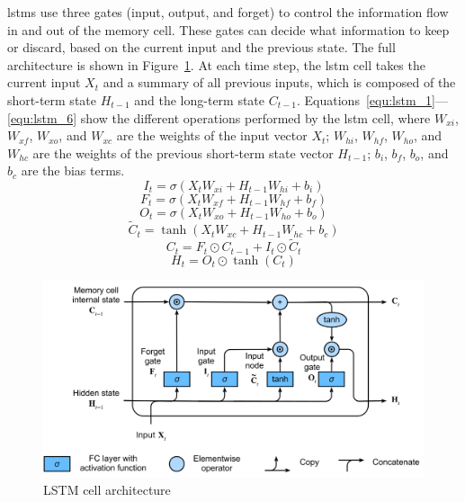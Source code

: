 \acrshort{lstm}s use three gates (input, output, and forget) to control the information flow in and out of the memory cell. These gates can decide what information to keep or discard, based on the current input and the previous state. The full architecture is shown in Figure~\ref{fig:lstm_architecture}. At each time step, the \acrshort{lstm} cell takes the current input $X_t$ and a summary of all previous inputs, which is composed of the short-term state $H_{t-1}$ and the long-term state $C_{t-1}$. Equations~\eqref{equ:lstm_1}---\eqref{equ:lstm_6} show the different operations performed by the \acrshort{lstm} cell, where $W_{xi}$, $W_{xf}$, $W_{xo}$, and $W_{xc}$ are the weights of the input vector $X_t$; $W_{hi}$, $W_{hf}$, $W_{ho}$, and $W_{hc}$ are the weights of the previous short-term state vector $H_{t-1}$; $b_i$, $b_f$, $b_o$, and $b_c$ are the bias terms.
\begin{equation}\label{equ:lstm_1}
I_t = \sigma(X_{t}W_{xi} + H_{t-1}W_{hi} + b_{i})
\end{equation}
\begin{equation}\label{equ:lstm_2}
F_t = \sigma(X_{t}W_{xf} + H_{t-1}W_{hf} + b_{f})
\end{equation}
\begin{equation}\label{equ:lstm_4}
O_t = \sigma(X_{t}W_{xo} + H_{t-1}W_{ho} + b_{o})
\end{equation}
\begin{equation}\label{equ:lstm_3}
\tilde{C}_t = \tanh(X_{t}W_{xc} + H_{t-1}W_{hc} + b_{c})
\end{equation}
\begin{equation}\label{equ:lstm_5}
C_t = F_t \odot C_{t-1} + I_t \odot \tilde{C}_t
\end{equation}
\begin{equation}\label{equ:lstm_6}
H_t = O_t \odot \tanh(C_t)
\end{equation}

\begin{figure}
    \centering
    \includegraphics[width=.65\linewidth]{images/lstm.png}
    \caption[LSTM cell architecture]{LSTM cell architecture~\parencite{zhang_dive_2023}}
    \label{fig:lstm_architecture}
\end{figure}

